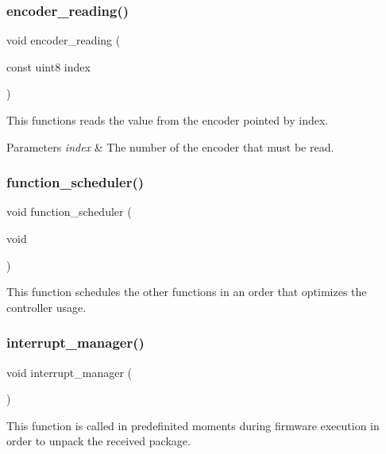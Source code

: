 \subsubsection{encoder\+\_\+reading()}
{\footnotesize\ttfamily void encoder\+\_\+reading (\begin{DoxyParamCaption}\item[{const uint8}]{index }\end{DoxyParamCaption})}

This functions reads the value from the encoder pointed by index.


\begin{DoxyParams}{Parameters}
{\em index} & The number of the encoder that must be read. \\
\hline
\end{DoxyParams}
\mbox{\label{interruptions_8c_a39df971c4e9f194be50c54dfd7aeabfe}} 
\subsubsection{function\+\_\+scheduler()}
{\footnotesize\ttfamily void function\+\_\+scheduler (\begin{DoxyParamCaption}\item[{void}]{ }\end{DoxyParamCaption})}

This function schedules the other functions in an order that optimizes the controller usage. \mbox{\label{interruptions_8c_a9790811526002d99b25a814afd02cbae}} 
\subsubsection{interrupt\+\_\+manager()}
{\footnotesize\ttfamily void interrupt\+\_\+manager (\begin{DoxyParamCaption}{ }\end{DoxyParamCaption})}

This function is called in predefinited moments during firmware execution in order to unpack the received package. \mbox{\label{interruptions_8c_a8c7c487a5a127331b0de53443e3ca964}} 
